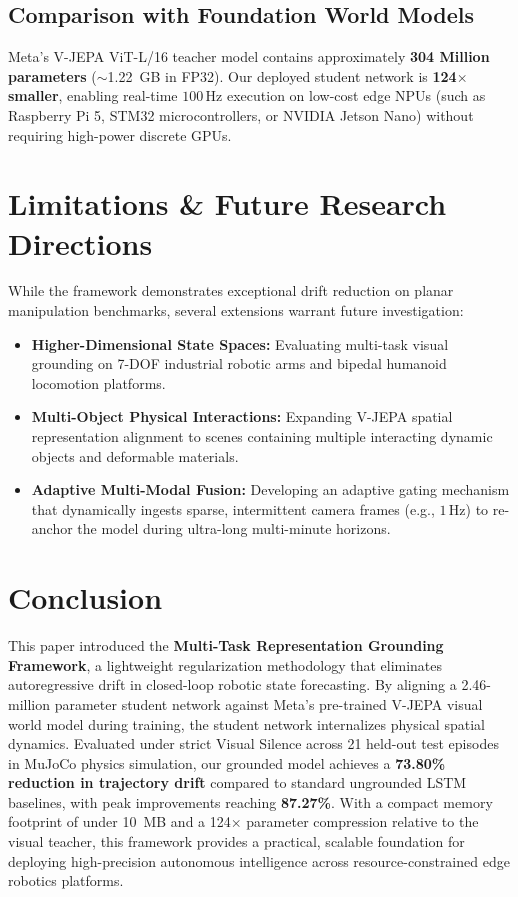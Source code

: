 \documentclass[11pt,a4paper]{article}
\begin{document}
\subsection{Comparison with Foundation World Models}
Meta's V-JEPA ViT-L/16 teacher model contains approximately \textbf{304 Million parameters} ($\sim$1.22~GB in FP32). Our deployed student network is \textbf{124$\times$ smaller}, enabling real-time $100\,\text{Hz}$ execution on low-cost edge NPUs (such as Raspberry Pi 5, STM32 microcontrollers, or NVIDIA Jetson Nano) without requiring high-power discrete GPUs.

\section{Limitations \& Future Research Directions}
\label{sec:limitations}

While the framework demonstrates exceptional drift reduction on planar manipulation benchmarks, several extensions warrant future investigation:
\begin{itemize}
    \item \textbf{Higher-Dimensional State Spaces:} Evaluating multi-task visual grounding on 7-DOF industrial robotic arms and bipedal humanoid locomotion platforms.
    \item \textbf{Multi-Object Physical Interactions:} Expanding V-JEPA spatial representation alignment to scenes containing multiple interacting dynamic objects and deformable materials.
    \item \textbf{Adaptive Multi-Modal Fusion:} Developing an adaptive gating mechanism that dynamically ingests sparse, intermittent camera frames (e.g., $1\,\text{Hz}$) to re-anchor the model during ultra-long multi-minute horizons.
\end{itemize}

\section{Conclusion}
\label{sec:conclusion}

This paper introduced the \textbf{Multi-Task Representation Grounding Framework}, a lightweight regularization methodology that eliminates autoregressive drift in closed-loop robotic state forecasting. By aligning a 2.46-million parameter student network against Meta's pre-trained V-JEPA visual world model during training, the student network internalizes physical spatial dynamics. Evaluated under strict Visual Silence across 21 held-out test episodes in MuJoCo physics simulation, our grounded model achieves a \textbf{73.80\% reduction in trajectory drift} compared to standard ungrounded LSTM baselines, with peak improvements reaching \textbf{87.27\%}. With a compact memory footprint of under 10~MB and a 124$\times$ parameter compression relative to the visual teacher, this framework provides a practical, scalable foundation for deploying high-precision autonomous intelligence across resource-constrained edge robotics platforms.
\end{document}
